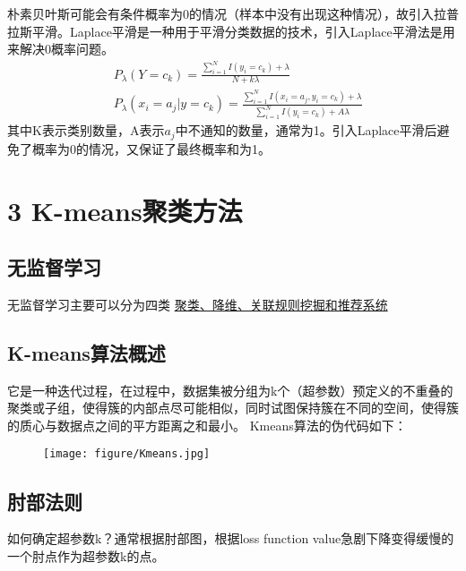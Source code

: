 \documentclass[twoside]{article}
\begin{document}
朴素贝叶斯可能会有条件概率为0的情况（样本中没有出现这种情况），故引入拉普拉斯平滑。Laplace平滑是一种用于平滑分类数据的技术，引入Laplace平滑法是用来解决0概率问题。
\begin{equation*}
    \begin{aligned}
    &P_{\lambda}(Y=c_k)=\frac{\sum_{i=1}^N I(y_i=c_k)+\lambda}{N+k\lambda}\\
    &P_{\lambda}(x_i=a_j|y=c_k)=\frac{\sum_{i=1}^N I(x_i=a_j,y_i=c_k)+\lambda}{\sum_{i=1}^N I(y_i=c_k)+A\lambda}
    \end{aligned}
\end{equation*}
其中K表示类别数量，A表示$a_j$中不通知的数量，通常为1。引入Laplace平滑后避免了概率为0的情况，又保证了最终概率和为1。
\section{3 K-means聚类方法}
\subsection*{无监督学习}
无监督学习主要可以分为四类
\underline{聚类、降维、关联规则挖掘和推荐系统}
\subsection*{K-means算法概述}
它是一种迭代过程，在过程中，数据集被分组为k个（超参数）预定义的不重叠的聚类或子组，使得簇的内部点尽可能相似，同时试图保持簇在不同的空间，使得簇的质心与数据点之间的平方距离之和最小。
Kmeans算法的伪代码如下：
\begin{figure}[h]
    \centering
    \texttt{[image: figure/Kmeans.jpg]}
\end{figure}
\subsection*{肘部法则}
如何确定超参数k？通常根据肘部图，根据loss function value急剧下降变得缓慢的一个肘点作为超参数k的点。
\end{document}
